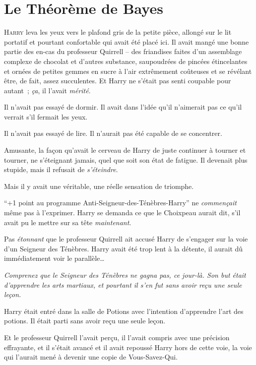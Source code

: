 \chapter{Le Théorème de Bayes}

\lettrine{H}{arry} leva les yeux vers le plafond gris de la petite pièce, allongé sur le lit portatif et pourtant confortable qui avait été placé ici.
Il avait mangé une bonne partie des en-cas du professeur Quirrell -- des friandises faites d'un assemblage complexe de chocolat et d'autres substance, saupoudrées de pincées étincelantes et ornées de petites gemmes en sucre à l'air extrêmement coûteuses et se révélant être, de fait, assez succulentes.
Et Harry ne s'était pas senti coupable pour autant~; \emph{ça}, il l'avait \emph{mérité}.

Il n'avait pas essayé de dormir.
Il avait dans l'idée qu'il n'aimerait pas ce qu'il verrait s'il fermait les yeux.

Il n'avait pas essayé de lire.
Il n'aurait pas été capable de se concentrer.

Amusante, la façon qu'avait le cerveau de Harry de juste continuer à tourner et tourner, ne s'éteignant jamais, quel que soit son état de fatigue.
Il devenait plus stupide, mais il refusait de \emph{s'éteindre}.

Mais il y avait une véritable, une réelle sensation de triomphe.

“+1 point au programme Anti-Seigneur-des-Ténèbres-Harry” ne \emph{commençait} même pas à l'exprimer.
Harry se demanda ce que le Choixpeau aurait dit, s'il avait pu le mettre sur sa tête \emph{maintenant}.

Pas \emph{étonnant} que le professeur Quirrell ait accusé Harry de s'engager sur la voie d'un Seigneur des Ténèbres.
Harry avait été trop lent à la détente, il aurait dû immédiatement voir le parallèle…

\emph{Comprenez que le Seigneur des Ténèbres ne gagna pas, ce jour-là.
Son but était d'apprendre les arts martiaux, et pourtant il s'en fut sans avoir reçu une seule leçon.}

Harry était entré dans la salle de Potions avec l'intention d'apprendre l'art des potions.
Il était parti sans avoir reçu une seule leçon.

Et le professeur Quirrell l'avait perçu, il l'avait compris avec une précision effrayante, et il s'était avancé et il avait repoussé Harry hors de cette voie, la voie qui l'aurait mené à devenir une copie de Vous-Savez-Qui.

